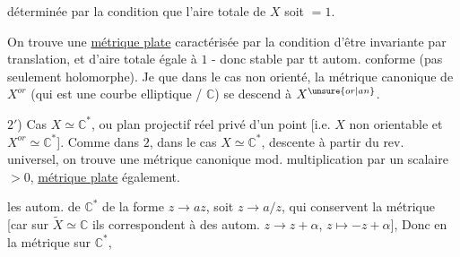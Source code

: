 déterminée par la condition que l'aire totale de $X$ soit $=1$.

On trouve une \uline{métrique plate} caractérisée par la condition d'être invariante par translation, et d'aire  totale égale à $1$ - donc stable par tt autom. conforme (pas seulement holomorphe). Je  que dans le cas non orienté, la métrique canonique de $X^{or}$ (qui est une courbe elliptique / $\mathbb C$) se descend à $X^{\unsure{or|an}}$.

$2'$) Cas $X\simeq\mathbb C^*$, ou plan projectif réel privé d'un point [i.e. $X$ non orientable et $X^{or}\simeq\mathbb C^*$]. Comme dans $2$, dans le cas $X\simeq\mathbb C^*$,   descente à partir du rev. universel, on trouve une métrique canonique mod. multiplication par un scalaire $>0$, \uline{métrique plate} également.

 les autom. de $\mathbb C^*$  de la forme $z\longrightarrow az$, soit $z\longrightarrow a/z$, qui conservent la métrique [car sur $\widetilde X\simeq\mathbb C$ ils correspondent à des autom. $z\longrightarrow z+\alpha$, $z\longmapsto-z+\alpha$], Donc en  la métrique sur $\mathbb C^*$, 
